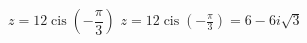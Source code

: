 { $z = 12\operatorname{cis}\left(-\dfrac{\pi}{3}\right)$ }
{ $z = 12\operatorname{cis}\left(-\frac{\pi}{3}\right) = 6 - 6i\sqrt{3}$ }
